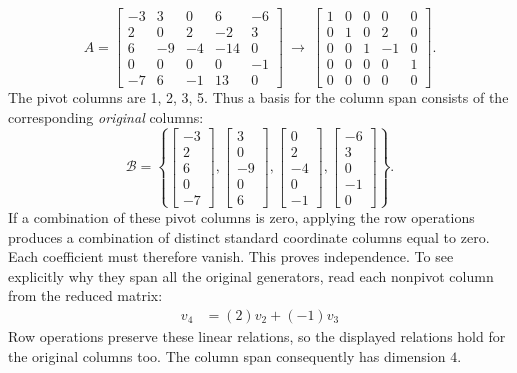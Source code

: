 \[A=\left[\begin{array}{rrrrr}-3&3&0&6&-6\\2&0&2&-2&3\\6&-9&-4&-14&0\\0&0&0&0&-1\\-7&6&-1&13&0\end{array}\right]\ \longrightarrow\ \left[\begin{array}{rrrrr}1&0&0&0&0\\0&1&0&2&0\\0&0&1&-1&0\\0&0&0&0&1\\0&0&0&0&0\end{array}\right].\]
The pivot columns are 1, 2, 3, 5. Thus a basis for the column span consists of the corresponding \emph{original} columns:
\[\mathcal B=\left\{\left[\begin{array}{r}-3\\2\\6\\0\\-7\end{array}\right],\left[\begin{array}{r}3\\0\\-9\\0\\6\end{array}\right],\left[\begin{array}{r}0\\2\\-4\\0\\-1\end{array}\right],\left[\begin{array}{r}-6\\3\\0\\-1\\0\end{array}\right]\right\}.\]
If a combination of these pivot columns is zero, applying the row operations produces a combination of distinct standard coordinate columns equal to zero. Each coefficient must therefore vanish. This proves independence. To see explicitly why they span all the original generators, read each nonpivot column from the reduced matrix:
\[\begin{aligned}v_{4}&=(2)v_{2}+(-1)v_{3}\end{aligned}\]
Row operations preserve these linear relations, so the displayed relations hold for the original columns too. The column span consequently has dimension $4$.


